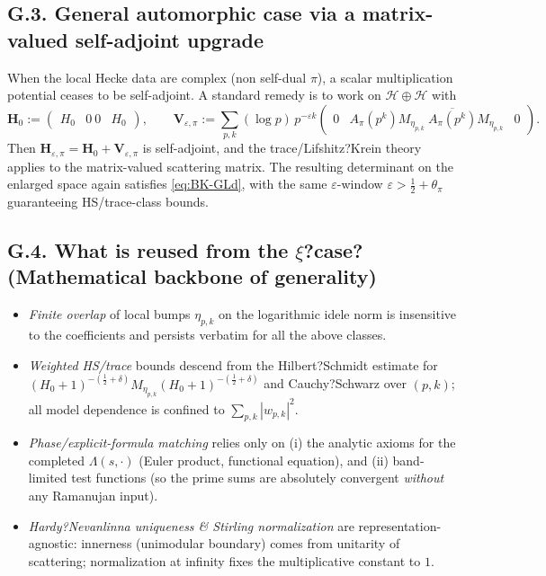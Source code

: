 ﻿\documentclass[12pt,a4paper]{article}
\theoremstyle{definition}
\theoremstyle{remark}
\begin{document}
\subsection{G.3. General automorphic case via a matrix-valued self-adjoint upgrade}
\label{sec:matrix-upgrade}
When the local Hecke data are complex (non self-dual $\pi$), a scalar multiplication potential ceases to be self-adjoint. 
A standard remedy is to work on $\mathcal H\oplus\mathcal H$ with
\begin{equation*}
\mathbf H_0 :=\begin{pmatrix}
  H_0 & 0 \
  0 & H_0
\end{pmatrix},\qquad\mathbf V_{\varepsilon,\pi} := \sum_{p,k}(\log p)\,p^{-\varepsilon k}\begin{pmatrix}
  0 & A_\pi(p^k) M_{\eta_{p,k}} \
  \overline{A_\pi(p^k)} M_{\eta_{p,k}} & 0
\end{pmatrix}.
\end{equation*}
Then $\mathbf H_{\varepsilon,\pi}=\mathbf H_0+\mathbf V_{\varepsilon,\pi}$ is self-adjoint, and the trace/Lifshitz?Krein theory applies to the matrix-valued scattering matrix. 
The resulting determinant on the enlarged space again satisfies 
\ref{eq:BK-GLd}, with the same $\varepsilon$-window $\varepsilon>\tfrac12+\theta_\pi$ guaranteeing HS/trace-class bounds.

\subsection{G.4. What is reused from the $\xi$?case? (Mathematical backbone of generality)}

\begin{itemize}
\item 
\emph{Finite overlap} of local bumps $\eta_{p,k}$ on the logarithmic idele norm is insensitive to the coefficients and persists verbatim for all the above classes.
\item 
\emph{Weighted HS/trace} bounds descend from the Hilbert?Schmidt estimate for $(H_0+1)^{-(\frac12+\delta)}M_{\eta_{p,k}}(H_0+1)^{-(\frac12+\delta)}$ and Cauchy?Schwarz over $(p,k)$; all model dependence is confined to $\sum_{p,k}|w_{p,k}|^2$.
\item 
\emph{Phase/explicit-formula matching} relies only on (i) the analytic axioms for the completed $\Lambda(s,\cdot)$ (Euler product, functional equation), and (ii) band-limited test functions (so the prime sums are absolutely convergent \emph{without} any Ramanujan input).
\item 
\emph{Hardy?Nevanlinna uniqueness \& Stirling normalization} are representation-agnostic: innerness (unimodular boundary) comes from unitarity of scattering; normalization at infinity fixes the multiplicative constant to $1$.
\end{itemize}
\end{document}
